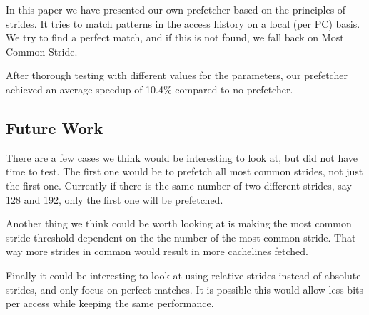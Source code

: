 In this paper we have presented our own prefetcher based on the principles of
strides. It tries to match patterns in the access history on a local (per PC)
basis. We try to find a perfect match, and if this is not found, we fall back
on Most Common Stride.

After thorough testing with different values for the parameters, our prefetcher
achieved an average speedup of 10.4\% compared to no prefetcher.

\subsection{Future Work}
There are a few cases we think would be interesting to look at, but did not have
time to test. The first one would be to prefetch all most common strides, not
just the first one. Currently if there is the same number of two different
strides, say 128 and 192, only the first one will be prefetched.

Another thing we think could be worth looking at is making the most common
stride threshold dependent on the the number of the most common stride.
That way more strides in common would result in more cachelines fetched.

Finally it could be interesting to look at using relative strides instead of
absolute strides, and only focus on perfect matches. It is possible this would
allow less bits per access while keeping the same performance.
\balance
